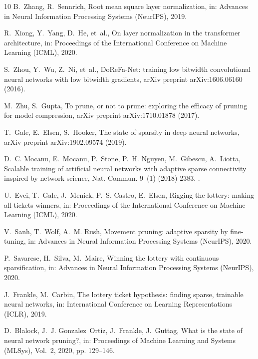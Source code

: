 \documentclass[final,5p,times,twocolumn]{elsarticle}
\theoremstyle{remark}
\begin{document}
\begin{thebibliography}{10}
B.~Zhang, R.~Sennrich, {Root mean square layer normalization}, in: Advances in
  Neural Information Processing Systems (NeurIPS), 2019.

R.~Xiong, Y.~Yang, D.~He, et~al., {On layer normalization in the transformer
  architecture}, in: Proceedings of the International Conference on Machine
  Learning (ICML), 2020.

S.~Zhou, Y.~Wu, Z.~Ni, et~al., {DoReFa-Net: training low bitwidth convolutional
  neural networks with low bitwidth gradients}, arXiv preprint arXiv:1606.06160
  (2016).

M.~Zhu, S.~Gupta, {To prune, or not to prune: exploring the efficacy of pruning
  for model compression}, arXiv preprint arXiv:1710.01878 (2017).

T.~Gale, E.~Elsen, S.~Hooker, {The state of sparsity in deep neural networks},
  arXiv preprint arXiv:1902.09574 (2019).

D.~C. Mocanu, E.~Mocanu, P.~Stone, P.~H. Nguyen, M.~Gibescu, A.~Liotta,
  {Scalable training of artificial neural networks with adaptive sparse
  connectivity inspired by network science}, Nat. Commun. 9~(1) (2018) 2383.
\newblock \href {https://doi.org/10.1038/s41467-018-04316-3}
  {}.

U.~Evci, T.~Gale, J.~Menick, P.~S. Castro, E.~Elsen, {Rigging the lottery:
  making all tickets winners}, in: Proceedings of the International Conference
  on Machine Learning (ICML), 2020.

V.~Sanh, T.~Wolf, A.~M. Rush, {Movement pruning: adaptive sparsity by
  fine-tuning}, in: Advances in Neural Information Processing Systems
  (NeurIPS), 2020.

P.~Savarese, H.~Silva, M.~Maire, {Winning the lottery with continuous
  sparsification}, in: Advances in Neural Information Processing Systems
  (NeurIPS), 2020.

J.~Frankle, M.~Carbin, {The lottery ticket hypothesis: finding sparse,
  trainable neural networks}, in: International Conference on Learning
  Representations (ICLR), 2019.

D.~Blalock, J.~J. Gonzalez~Ortiz, J.~Frankle, J.~Guttag, {What is the state of
  neural network pruning?}, in: Proceedings of Machine Learning and Systems
  (MLSys), Vol.~2, 2020, pp. 129--146.


\end{thebibliography}
\end{document}

